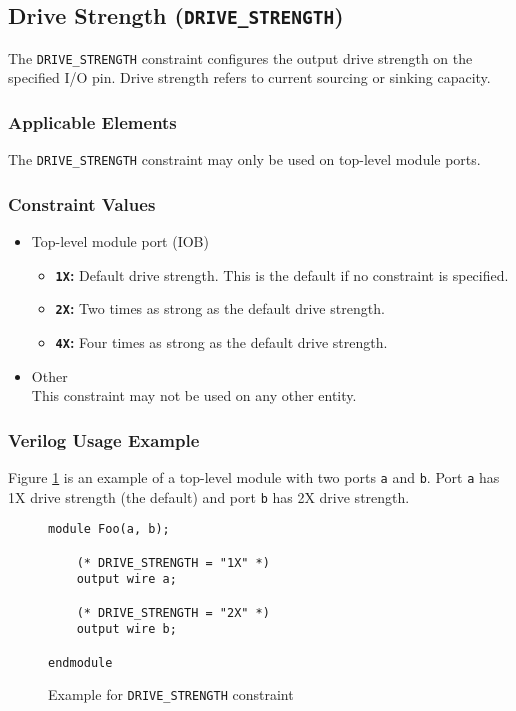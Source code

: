 \documentclass[11pt]{article}
\newcommand{\tokenstyle}[1]{\texttt{#1}}
\newcommand{\wirestyle}[1]{\texttt{#1}}
\newcommand{\valuestyle}[1]{\texttt{#1}}
\newcommand{\strvaluestyle}[1]{\valuestyle{\textquotedbl#1\textquotedbl}}
\newcommand{\strexamplestyle}[1]{\textbf{\strvaluestyle{#1}:}}
\newcommand{\whenstyle}[1]{{\fontseries{sb}\selectfont#1}}
\begin{document}

\pagebreak
\subsection{Drive Strength (\tokenstyle{DRIVE\_STRENGTH})}

The \tokenstyle{DRIVE\_STRENGTH} constraint configures the output drive strength on the specified I/O pin. Drive strength refers to current sourcing or sinking capacity.

\subsubsection{Applicable Elements}
The \tokenstyle{DRIVE\_STRENGTH} constraint may only be used on top-level module ports.

\subsubsection{Constraint Values}
\begin{itemize}
\item \whenstyle{Top-level module port (IOB)}
	\begin{itemize}
		\item \strexamplestyle{1X} Default drive strength. This is the default if no constraint is specified.
		\item \strexamplestyle{2X} Two times as strong as the default drive strength.
		\item \strexamplestyle{4X} Four times as strong as the default drive strength.
	\end{itemize}
\item \whenstyle{Other} \\
This constraint may not be used on any other entity.
\end{itemize}

\subsubsection{Verilog Usage Example}

Figure \ref{constraint-drivestrength} is an example of a top-level module with two ports \wirestyle{a} and \wirestyle{b}. Port \wirestyle{a} has 1X drive strength (the default) and port \wirestyle{b} has 2X drive strength.

\begin{figure}[h]
\begin{lstlisting}
module Foo(a, b);

	(* DRIVE_STRENGTH = "1X" *)
	output wire a;

	(* DRIVE_STRENGTH = "2X" *)
	output wire b;

endmodule
\end{lstlisting}
\caption{Example for \tokenstyle{DRIVE\_STRENGTH} constraint}
\label{constraint-drivestrength}
\end{figure}
\end{document}

